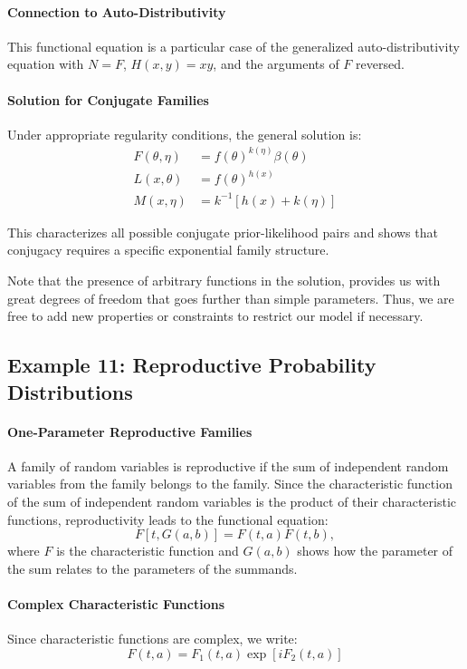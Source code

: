 \paragraph{Connection to Auto-Distributivity}
This functional equation is a particular case of the generalized auto-distributivity equation with $N = F$, $H(x, y) = xy$, and the arguments of $F$ reversed.

\paragraph{Solution for Conjugate Families}
Under appropriate regularity conditions, the general solution is:
\begin{align}
F(\theta, \eta) &= f(\theta)^{k(\eta)}\beta(\theta) \\
L(x, \theta) &= f(\theta)^{h(x)} \\
M(x, \eta) &= k^{-1}[h(x) + k(\eta)]
\end{align}

This characterizes all possible conjugate prior-likelihood pairs and shows that conjugacy requires a specific exponential family structure.

Note that the presence of arbitrary functions in the solution, provides us with great degrees of freedom that goes further than simple parameters. Thus, we are free to add new properties or constraints to restrict our model if necessary.

\subsection{Example 11: Reproductive Probability Distributions}
\paragraph{One-Parameter Reproductive Families}
A family of random variables is reproductive if the sum of independent random variables from the family belongs to the family. Since the characteristic function of the sum of independent random variables is the product of their characteristic functions, reproductivity leads to the functional equation:
\begin{equation}
    F[t, G(a, b)] = F(t, a)F(t, b),
\end{equation}
where $F$ is the characteristic function and $G(a, b)$ shows how the parameter of the sum relates to the parameters of the summands.

\paragraph{Complex Characteristic Functions}
Since characteristic functions are complex, we write:
\begin{equation}
F(t, a) = F_1(t, a)\exp[iF_2(t, a)]
\end{equation}

